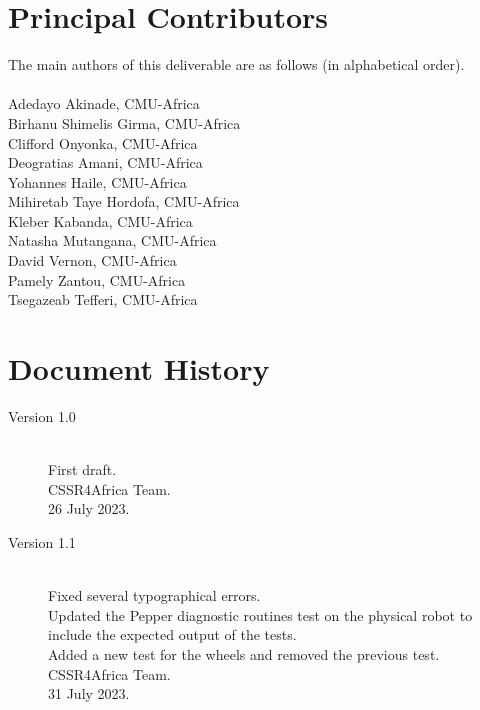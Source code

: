 \documentclass{CSSRforAfrica}
\newcommand{\blank}{~\\}
\begin{document}
{		\section*{Principal Contributors}
		\label{contributors}
		The main authors of this deliverable are as follows (in alphabetical order).
		\blank
		~
		\blank
		Adedayo Akinade, CMU-Africa\\          %
		Birhanu Shimelis Girma, CMU-Africa\\
		Clifford Onyonka, CMU-Africa\\
		Deogratias Amani, CMU-Africa\\  
		Yohannes Haile, CMU-Africa\\ 
		Mihiretab Taye Hordofa, CMU-Africa\\ 
		Kleber Kabanda, CMU-Africa\\
		Natasha Mutangana, CMU-Africa\\ 
		David Vernon, CMU-Africa\\
		Pamely Zantou, CMU-Africa\\
		Tsegazeab Tefferi, CMU-Africa\\
		
		\pagebreak
		\section*{Document History}
		\label{document_history}
		
		\begin{description}
			
			\item [Version 1.0]~\\
			First draft. \\
			CSSR4Africa Team. \\ %
			26 July 2023. %
			
			\item [Version 1.1]~\\
			Fixed several typographical errors.\\
			Updated the Pepper diagnostic routines test on the physical robot to include the expected output of the tests.\\
			Added a new test for the wheels and removed the previous test.\\
			CSSR4Africa Team.\\
			31 July 2023.
			

\end{description}}
\end{document}
